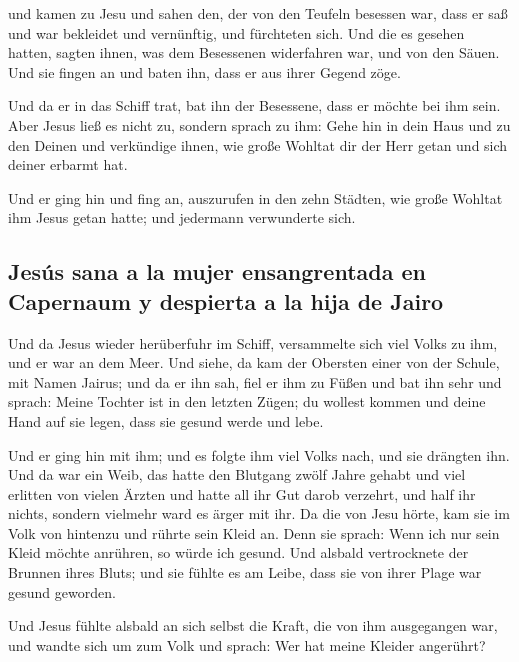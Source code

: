  und kamen zu Jesu und sahen den, der von den Teufeln
besessen war, dass er saß und war bekleidet und vernünftig, und
fürchteten sich.  Und die es gesehen hatten, sagten
ihnen, was dem Besessenen widerfahren war, und von den Säuen.
 Und sie fingen an und baten ihn, dass er aus ihrer
Gegend zöge.

 Und da er in das Schiff trat, bat ihn der Besessene,
dass er möchte bei ihm sein.  Aber Jesus ließ es nicht
zu, sondern sprach zu ihm: Gehe hin in dein Haus und zu den Deinen und
verkündige ihnen, wie große Wohltat dir der Herr getan und sich deiner
erbarmt hat.

 Und er ging hin und fing an, auszurufen in den zehn
Städten, wie große Wohltat ihm Jesus getan hatte; und jedermann
verwunderte sich.

\hypertarget{jesuxfas-sana-a-la-mujer-ensangrentada-en-capernaum-y-despierta-a-la-hija-de-jairo}{%
\subsection{Jesús sana a la mujer ensangrentada en Capernaum y despierta
a la hija de
Jairo}\label{jesuxfas-sana-a-la-mujer-ensangrentada-en-capernaum-y-despierta-a-la-hija-de-jairo}}

 Und da Jesus wieder herüberfuhr im Schiff, versammelte
sich viel Volks zu ihm, und er war an dem Meer.  Und
siehe, da kam der Obersten einer von der Schule, mit Namen Jairus; und
da er ihn sah, fiel er ihm zu Füßen  und bat ihn sehr und
sprach: Meine Tochter ist in den letzten Zügen; du wollest kommen und
deine Hand auf sie legen, dass sie gesund werde und lebe.

 Und er ging hin mit ihm; und es folgte ihm viel Volks
nach, und sie drängten ihn.  Und da war ein Weib, das
hatte den Blutgang zwölf Jahre gehabt  und viel erlitten
von vielen Ärzten und hatte all ihr Gut darob verzehrt, und half ihr
nichts, sondern vielmehr ward es ärger mit ihr.  Da die
von Jesu hörte, kam sie im Volk von hintenzu und rührte sein Kleid an.
 Denn sie sprach: Wenn ich nur sein Kleid möchte
anrühren, so würde ich gesund.  Und alsbald vertrocknete
der Brunnen ihres Bluts; und sie fühlte es am Leibe, dass sie von ihrer
Plage war gesund geworden.

 Und Jesus fühlte alsbald an sich selbst die Kraft, die
von ihm ausgegangen war, und wandte sich um zum Volk und sprach: Wer hat
meine Kleider angerührt?

